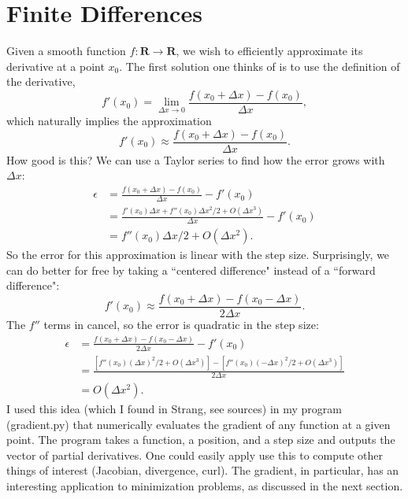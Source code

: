 \documentclass[11pt]{article}
\theoremstyle{plain}
\begin{document}
\section{Finite Differences}
\indent Given a smooth function $f:\mathbf{R}\to\mathbf{R}$, we wish to efficiently approximate its derivative at a point $x_0$. The first solution one thinks of is to use the definition of the derivative,
\begin{equation*}
	f'(x_0) = \lim_{\Delta x\to 0}\frac{f(x_0+\Delta x) - f(x_0)}{\Delta x},
\end{equation*}
which naturally implies the approximation
\begin{equation*}
	f'(x_0) \approx \frac{f(x_0+\Delta x) - f(x_0)}{\Delta x}.
\end{equation*}
How good is this? We can use a Taylor series to find how the error grows with $\Delta x$:
\begin{align*}
	\epsilon &= \frac{f(x_0+\Delta x) - f(x_0)}{\Delta x} -f'(x_0)\\
	&= \frac{f'(x_0)\Delta x + f''(x_0)\Delta x^2/2 + O(\Delta x^3)}{\Delta x} - f'(x_0) \\
	&= f''(x_0)\Delta x /2 + O(\Delta x^2).
\end{align*}
So the error for this approximation is linear with the step size. Surprisingly, we can do better for free by taking a ``centered difference" instead of a ``forward difference":
\begin{equation*}
	f'(x_0) \approx \frac{f(x_0+\Delta x) - f(x_0-\Delta x)}{2\Delta x}.
\end{equation*}
The $f''$ terms in cancel, so the error is quadratic in the step size:
\begin{align*}
	\epsilon &= \frac{f(x_0+\Delta x) - f(x_0-\Delta x)}{2\Delta x} - f'(x_0) \\
	&= \frac{[f''(x_0)(\Delta x)^2/2 + O(\Delta x^3)] - [f''(x_0)(-\Delta x)^2/2 + O(\Delta x^3)]}{2\Delta x} \\
	&= O(\Delta x^2).
\end{align*}
\indent I used this idea (which I found in Strang, see sources) in my program (gradient.py) that numerically evaluates the gradient of any function at a given point. The program takes a function, a position, and a step size and outputs the vector of partial derivatives. One could easily apply use this to compute other things of interest (Jacobian, divergence, curl). The gradient, in particular, has an interesting application to minimization problems, as discussed in the next section. 
\par
\end{document}

